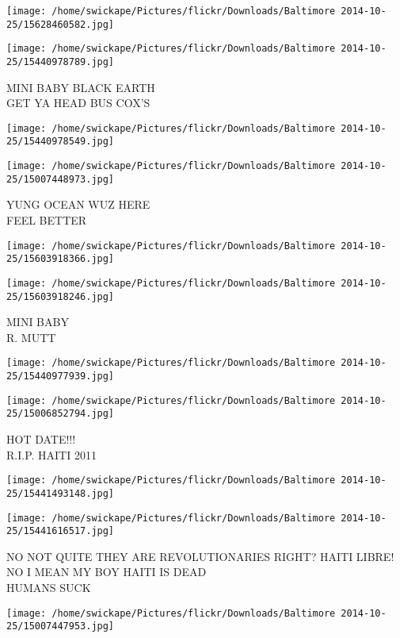 \documentclass[10pt,letterpaper]{article}
\begin{document}
\texttt{[image: /home/swickape/Pictures/flickr/Downloads/Baltimore 2014-10-25/15628460582.jpg]}

\vspace{0.25in}
\texttt{[image: /home/swickape/Pictures/flickr/Downloads/Baltimore 2014-10-25/15440978789.jpg]}

MINI BABY BLACK EARTH\\
GET YA HEAD BUS COX'S
\pagebreak

\texttt{[image: /home/swickape/Pictures/flickr/Downloads/Baltimore 2014-10-25/15440978549.jpg]}

\vspace{0.25in}
\texttt{[image: /home/swickape/Pictures/flickr/Downloads/Baltimore 2014-10-25/15007448973.jpg]}

YUNG OCEAN WUZ HERE\\
FEEL BETTER
\pagebreak

\texttt{[image: /home/swickape/Pictures/flickr/Downloads/Baltimore 2014-10-25/15603918366.jpg]}

\vspace{0.25in}
\texttt{[image: /home/swickape/Pictures/flickr/Downloads/Baltimore 2014-10-25/15603918246.jpg]}

MINI BABY\\
R. MUTT
\pagebreak

\texttt{[image: /home/swickape/Pictures/flickr/Downloads/Baltimore 2014-10-25/15440977939.jpg]}

\vspace{0.25in}
\texttt{[image: /home/swickape/Pictures/flickr/Downloads/Baltimore 2014-10-25/15006852794.jpg]}

HOT DATE!!!\\
R.I.P. HAITI 2011
\pagebreak

\texttt{[image: /home/swickape/Pictures/flickr/Downloads/Baltimore 2014-10-25/15441493148.jpg]}

\vspace{0.25in}
\texttt{[image: /home/swickape/Pictures/flickr/Downloads/Baltimore 2014-10-25/15441616517.jpg]}

NO NOT QUITE THEY ARE REVOLUTIONARIES RIGHT?  HAITI LIBRE!  NO I MEAN MY BOY HAITI IS DEAD\\
HUMANS SUCK
\pagebreak

\texttt{[image: /home/swickape/Pictures/flickr/Downloads/Baltimore 2014-10-25/15007447953.jpg]}
\end{document}
